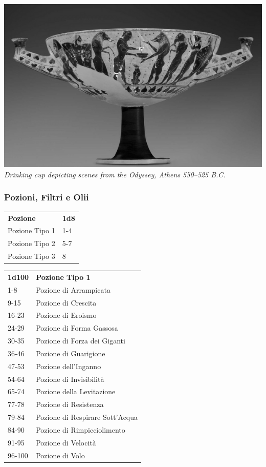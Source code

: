 \begin{multicols}{2}
\begin{center}
\includegraphics[width=0.8\linewidth]{immagini/cupdrinking.png}\\

\textit{Drinking cup depicting scenes from the Odyssey, Athens 550–525 B.C.}
\end{center}

\subsubsection{Pozioni, Filtri e Olii}

\begin{tabular}{ll}
\textbf{Pozione}&\textbf{1d8}\\
Pozione Tipo 1 &1-4\\
Pozione Tipo 2 &5-7\\
Pozione Tipo 3 &8\\
\end{tabular}

\medskip

\begin{tabular}{ll}
\textbf{1d100} & \textbf{Pozione Tipo 1}\\
1-8   &Pozione di Arrampicata\\
9-15  &Pozione di Crescita\\
16-23 &Pozione di Eroismo\\
24-29 &Pozione di Forma Gassosa\\
30-35 &Pozione di Forza dei Giganti\\
36-46 &Pozione di Guarigione\\
47-53 &Pozione dell'Inganno\\
54-64 &Pozione di Invisibilità\\
65-74 &Pozione della Levitazione\\
77-78 &Pozione di Resistenza\\
79-84 &Pozione di Respirare Sott'Acqua\\
84-90 &Pozione di Rimpicciolimento\\
91-95 &Pozione di Velocità\\
96-100 &Pozione di Volo\\
\end{tabular}


\end{multicols}
